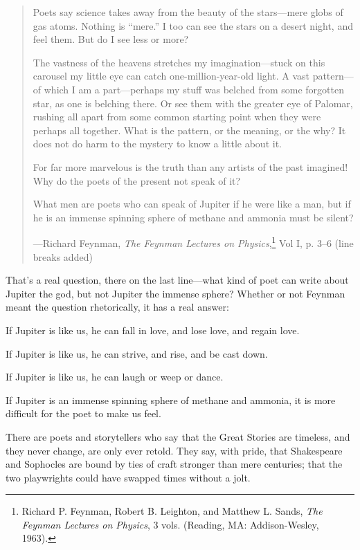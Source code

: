 \begin{quotation}
{
 Poets say science takes away from the beauty of the stars---mere
globs of gas atoms. Nothing is
``mere.'' I too can see the stars on
a desert night, and feel them. But do I see less or more?}

{
 The vastness of the heavens stretches my imagination---stuck on
this carousel my little eye can catch one-million-year-old light. A
vast pattern---of which I am a part---perhaps my stuff was belched from
some forgotten star, as one is belching there. Or see them with the
greater eye of Palomar, rushing all apart from some common starting
point when they were perhaps all together. What is the pattern, or the
meaning, or the why? It does not do harm to the mystery to know a
little about it.}

{
 For far more marvelous is the truth than any artists of the past
imagined! Why do the poets of the present not speak of it?}

{
 What men are poets who can speak of Jupiter if he were like a man,
but if he is an immense spinning sphere of methane and ammonia must be
silent?}

{\raggedleft
 {}---Richard Feynman, \textit{The Feynman Lectures on
Physics},\footnote{Richard P. Feynman, Robert B. Leighton, and Matthew L. Sands,
\textit{The Feynman Lectures on Physics}, 3 vols. (Reading, MA:
Addison-Wesley, 1963).}\newline
 Vol I, p. 3--6 (line breaks added)
\par}
\end{quotation}

{
 That's a real question, there on the last
line---what kind of poet can write about Jupiter the god, but not
Jupiter the immense sphere? Whether or not Feynman meant the question
rhetorically, it has a real answer:}

{
 If Jupiter is like us, he can fall in love, and lose love, and
regain love.}

{
 If Jupiter is like us, he can strive, and rise, and be cast down.}

{
 If Jupiter is like us, he can laugh or weep or dance.}

{
 If Jupiter is an immense spinning sphere of methane and ammonia,
it is more difficult for the poet to make us feel.}

{
 There are poets and storytellers who say that the Great Stories
are timeless, and they never change, are only ever retold. They say,
with pride, that Shakespeare and Sophocles are bound by ties of craft
stronger than mere centuries; that the two playwrights could have
swapped times without a jolt.}

